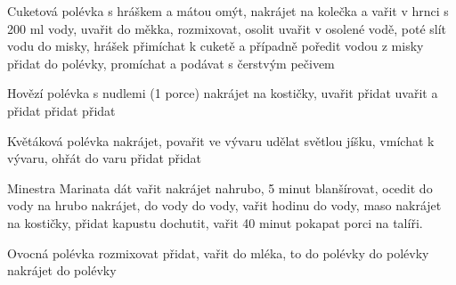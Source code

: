 \documentclass[12pt,a4paper]{article}
\begin{document}
\begin{recipe}{Cuketová polévka s hráškem a mátou}
   omýt, nakrájet na kolečka a vařit v hrnci s 200 ml vody, uvařit do měkka, rozmixovat, osolit
   uvařit v osolené vodě, poté slít vodu do misky, hrášek přimíchat k cuketě a případně poředit vodou z misky
   přidat do polévky, promíchat a podávat s čerstvým pečivem
\end{recipe}
\newpage

\begin{recipe}{Hovězí polévka s nudlemi (1 porce)}
   nakrájet na kostičky, uvařit
   přidat
   uvařit a přidat
   přidat
   přidat
\end{recipe}
\newpage

\begin{recipe}{Květáková polévka}
   nakrájet, povařit ve vývaru
   udělat světlou jíšku, vmíchat k vývaru, ohřát do varu
   přidat
   přidat
\end{recipe}
\newpage

\begin{recipe}{Minestra Marinata}
   dát vařit
   nakrájet nahrubo, 5 minut blanšírovat, ocedit
   do vody
   na hrubo nakrájet, do vody
   do vody, vařit hodinu
   do vody, maso nakrájet na kostičky, přidat kapustu
   dochutit, vařit 40 minut
   pokapat porci na talíři.
\end{recipe}
\newpage

\begin{recipe}{Ovocná polévka}
   rozmixovat
   přidat, vařit
   do mléka, to do polévky
   do polévky
   nakrájet do polévky
\end{recipe}
\newpage
\end{document}
